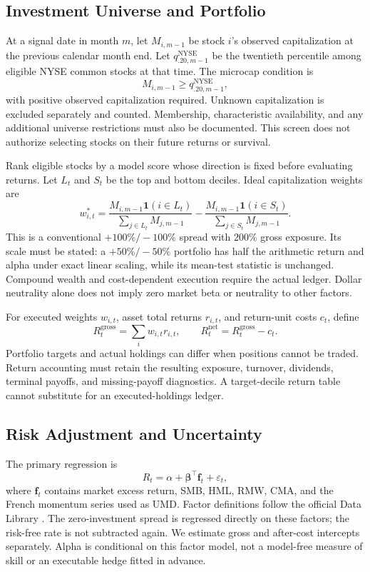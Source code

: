 \documentclass{article}
\begin{document}
\subsection{Investment Universe and Portfolio}
At a signal date in month $m$, let $M_{i,m-1}$ be stock $i$'s observed capitalization at the previous calendar month end. Let $q_{.20,m-1}^{\mathrm{NYSE}}$ be the twentieth percentile among eligible NYSE common stocks at that time. The microcap condition is
\begin{equation}
M_{i,m-1}\geq q_{.20,m-1}^{\mathrm{NYSE}},
\end{equation}
with positive observed capitalization required. Unknown capitalization is excluded separately and counted. Membership, characteristic availability, and any additional universe restrictions must also be documented. This screen does not authorize selecting stocks on their future returns or survival.

Rank eligible stocks by a model score whose direction is fixed before evaluating returns. Let $L_t$ and $S_t$ be the top and bottom deciles. Ideal capitalization weights are
\begin{equation}
w^*_{i,t}=\frac{M_{i,m-1}\mathbf{1}(i\in L_t)}{\sum_{j\in L_t}M_{j,m-1}}
-\frac{M_{i,m-1}\mathbf{1}(i\in S_t)}{\sum_{j\in S_t}M_{j,m-1}}.
\end{equation}
This is a conventional $+100\%/-100\%$ spread with 200\% gross exposure. Its scale must be stated: a $+50\%/-50\%$ portfolio has half the arithmetic return and alpha under exact linear scaling, while its mean-test statistic is unchanged. Compound wealth and cost-dependent execution require the actual ledger. Dollar neutrality alone does not imply zero market beta or neutrality to other factors.

For executed weights $w_{i,t}$, asset total returns $r_{i,t}$, and return-unit costs $c_t$, define
\begin{equation}
R_t^{\mathrm{gross}}=\sum_i w_{i,t}r_{i,t},\qquad
R_t^{\mathrm{net}}=R_t^{\mathrm{gross}}-c_t.
\end{equation}
Portfolio targets and actual holdings can differ when positions cannot be traded. Return accounting must retain the resulting exposure, turnover, dividends, terminal payoffs, and missing-payoff diagnostics. A target-decile return table cannot substitute for an executed-holdings ledger.

\subsection{Risk Adjustment and Uncertainty}
The primary regression is
\begin{equation}
R_t=\alpha+\boldsymbol\beta^{\top}\mathbf f_t+\varepsilon_t,
\label{eq:alpha}
\end{equation}
where $\mathbf f_t$ contains market excess return, SMB, HML, RMW, CMA, and the French momentum series used as UMD. Factor definitions follow the official Data Library \cite{french}. The zero-investment spread is regressed directly on these factors; the risk-free rate is not subtracted again. We estimate gross and after-cost intercepts separately. Alpha is conditional on this factor model, not a model-free measure of skill or an executable hedge fitted in advance.
\end{document}

